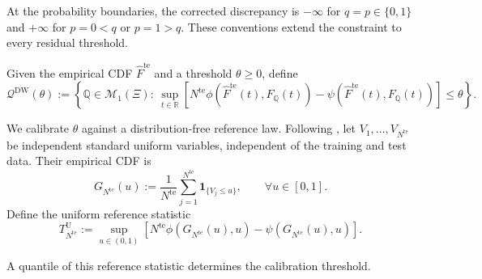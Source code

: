\documentclass[review,11pt,3p,authoryear,nopreprintline]{elsarticle}
\begin{document}
At the probability boundaries, the corrected discrepancy is $-\infty$ for $q=p\in\{0,1\}$ and $+\infty$ for $p=0<q$ or $p=1>q$. These conventions extend the constraint to every residual threshold.

\begin{definition}
  \label{definition-dw-ambiguity-set}
  Given the empirical CDF $\widehat F^{\mathrm{te}}$ and a threshold $\theta\ge0$, define
  \begin{equation} 
    \label{eq-cdf-ambiguity-set}
      \mathcal Q^{\mathrm{DW}}(\theta):=\left\{\mathbb Q\in\mathcal M_1(\Xi):\ 
      \sup_{t\in\mathbb R}\left[ N^{\mathrm{te}}\phi\!\left(\widehat F^{\mathrm{te}}(t),F_{\mathbb Q}(t)\right) 
       {}-\psi\!\left(\widehat F^{\mathrm{te}}(t),F_{\mathbb Q}(t)\right)\right]\le\theta\right\}. 
  \end{equation} 
\end{definition}

We calibrate $\theta$ against a distribution-free reference law. Following \citet{L.J23}, let $V_1,\ldots,V_{N^{\mathrm{te}}}$ be independent standard uniform variables, independent of the training and test data. Their empirical CDF is
\begin{equation*}
  G_{N^{\mathrm{te}}}(u):=\frac{1}{N^{\mathrm{te}}}\sum_{j=1}^{N^{\mathrm{te}}}\mathbf 1_{\{V_j\le u\}},\qquad \forall u\in[0,1].
\end{equation*}
Define the uniform reference statistic
\begin{equation}
  T_{N^{\mathrm{te}}}^{\mathrm U}:=\sup_{u\in(0,1)}\left[N^{\mathrm{te}}\phi\!\left(G_{N^{\mathrm{te}}}(u),u\right)-\psi\!\left(G_{N^{\mathrm{te}}}(u),u\right)\right].
  \label{eq-dw-reference-statistic}
\end{equation}

A quantile of this reference statistic determines the calibration threshold.
\end{document}
